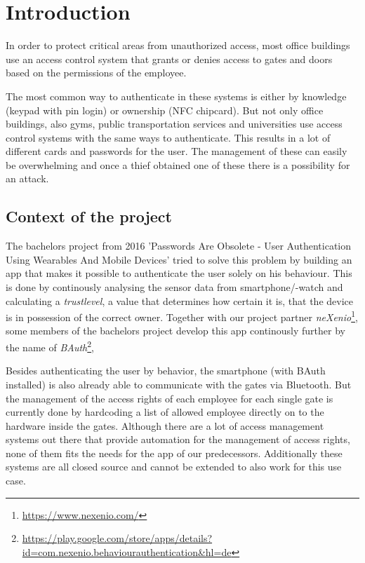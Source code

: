 \section{Introduction}

In order to protect critical areas from unauthorized access, most office buildings use an access control system that grants or denies access to gates and doors based on the permissions of the employee.

The most common way to authenticate in these systems is either by knowledge (keypad with pin login) or ownership (NFC chipcard).
But not only office buildings, also gyms, public transportation services and universities use access control systems with the same ways to authenticate. This results in a lot of different cards and passwords for the user. The management of these can easily be overwhelming and once a thief obtained one of these there is a possibility for an attack.

\subsection{Context of the project}
\label{Context of the project}

The bachelors project from 2016 'Passwords Are Obsolete - User Authentication Using Wearables And Mobile Devices' tried to solve this problem by building an app that makes it possible to authenticate the user solely on his behaviour. This is done by continously analysing the sensor data from smartphone/-watch and calculating a \emph{trustlevel}, a value that determines how certain it is, that the device is in possession of the correct owner.
Together with our project partner \emph{neXenio}\footnote{\url{https://www.nexenio.com/}}, some members of the bachelors project develop this app continously further by the name of \emph{BAuth}\footnote{\url{https://play.google.com/store/apps/details?id=com.nexenio.behaviourauthentication&hl=de}}, 

Besides authenticating the user by behavior, the smartphone (with BAuth installed) is also already able to communicate with the gates via Bluetooth. But the management of the access rights of each employee for each single gate is currently done by hardcoding a list of allowed employee directly on to the hardware inside the gates. Although there are a lot of access management systems out there that provide automation for the management of access rights, none of them fits the needs for the app of our predecessors. Additionally these systems are all closed source and cannot be extended to also work for this use case. 

